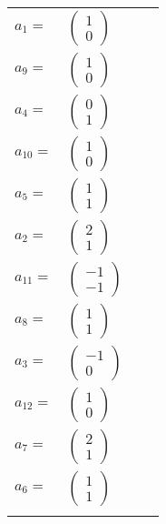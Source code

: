 \documentclass[1p]{elsarticle_modified}
\theoremstyle{definition}
\begin{document}
\begin{tabular}{m{7pt} m{180pt} m{7pt} m{180pt} }
\flushright $a_{1}=$&$\begin{pmatrix}1\\0\end{pmatrix}$ \\
\flushright $a_{9}=$&$\begin{pmatrix}1\\0\end{pmatrix}$ \\
\flushright $a_{4}=$&$\begin{pmatrix}0\\1\end{pmatrix}$ \\
\flushright $a_{10}=$&$\begin{pmatrix}1\\0\end{pmatrix}$ \\
\flushright $a_{5}=$&$\begin{pmatrix}1\\1\end{pmatrix}$ \\
\flushright $a_{2}=$&$\begin{pmatrix}2\\1\end{pmatrix}$ \\
\flushright $a_{11}=$&$\begin{pmatrix}-1\\-1\end{pmatrix}$ \\
\flushright $a_{8}=$&$\begin{pmatrix}1\\1\end{pmatrix}$ \\
\flushright $a_{3}=$&$\begin{pmatrix}-1\\0\end{pmatrix}$ \\
\flushright $a_{12}=$&$\begin{pmatrix}1\\0\end{pmatrix}$ \\
\flushright $a_{7}=$&$\begin{pmatrix}2\\1\end{pmatrix}$ \\
\flushright $a_{6}=$&$\begin{pmatrix}1\\1\end{pmatrix}$\\&\end{tabular}
\end{document}
